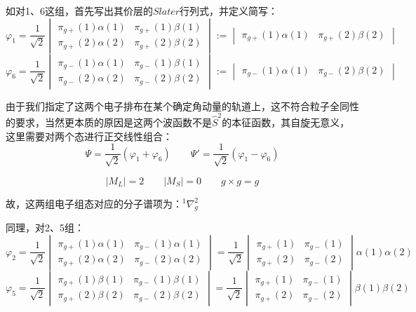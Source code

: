 如对1、6这组，首先写出其价层的$Slater$行列式，并定义简写：
\[
\varphi_1=\frac{1}{\sqrt{2}}
\begin{vmatrix}
    \pi_{g+}(1)\alpha(1) & \pi_{g+}(1)\beta(1) \\
    \pi_{g+}(2)\alpha(2) & \pi_{g+}(2)\beta(2)
\end{vmatrix}
:=
\begin{vmatrix}
    \pi_{g+}(1)\alpha(1) & \pi_{g+}(2)\beta(2)
\end{vmatrix}
\]
\[
\varphi_6=\frac{1}{\sqrt{2}}
\begin{vmatrix}
    \pi_{g-}(1)\alpha(1) & \pi_{g-}(1)\beta(1) \\
    \pi_{g-}(2)\alpha(2) & \pi_{g-}(2)\beta(2)
\end{vmatrix}
:=
\begin{vmatrix}
    \pi_{g-}(1)\alpha(1) & \pi_{g-}(2)\beta(2)
\end{vmatrix}
\]

由于我们指定了这两个电子排布在某个确定角动量的轨道上，这不符合粒子全同性的要求，当然更本质的原因是这两个波函数不是$\hat{S}^2$的本征函数，其自旋无意义，这里需要对两个态进行正交线性组合：
\[\Psi=\frac{1}{\sqrt{2}}(\varphi_1+\varphi_6) \qquad \Psi'=\frac{1}{\sqrt{2}}(\varphi_1-\varphi_6)\]

\[|M_L|=2 \qquad |M_S|=0 \qquad g \times g=g\]

故，这两组电子组态对应的分子谱项为：$^1\nabla^2_g$

同理，对2、5组：
\[
\varphi_2=\frac{1}{\sqrt{2}}
\begin{vmatrix}
    \pi_{g+}(1)\alpha(1) & \pi_{g-}(1)\alpha(1) \\
    \pi_{g+}(2)\alpha(2) & \pi_{g-}(2)\alpha(2)
\end{vmatrix}
=\frac{1}{\sqrt{2}}
\begin{vmatrix}
    \pi_{g+}(1) & \pi_{g-}(1) \\
    \pi_{g+}(2) & \pi_{g-}(2)
\end{vmatrix}
\alpha(1)\alpha(2)
\]
\[
\varphi_5=\frac{1}{\sqrt{2}}
\begin{vmatrix}
    \pi_{g+}(1)\beta(1) & \pi_{g-}(1)\beta(1) \\
    \pi_{g+}(2)\beta(2) & \pi_{g-}(2)\beta(2)
\end{vmatrix}
=\frac{1}{\sqrt{2}}
\begin{vmatrix}
    \pi_{g+}(1) & \pi_{g-}(1) \\
    \pi_{g+}(2) & \pi_{g-}(2)
\end{vmatrix}
\beta(1)\beta(2)
\]

